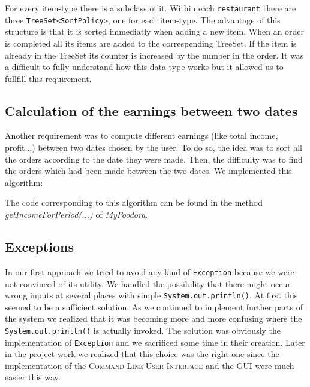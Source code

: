 

For every item-type there is a subclass of it. Within each 
\lstinline|restaurant| there are three \lstinline|TreeSet<SortPolicy>|, one for each 
item-type. The advantage of this structure is that it is sorted immediatly when adding a new 
item. When an order is completed all its items are added to the correspending TreeSet.
If the item is already in the TreeSet its counter is increased by the number in the 
order. It was a difficult to fully understand how this data-type works but it allowed us
to fullfill this requirement.

\subsection{Calculation of the earnings between two dates}
\label{calculation-between-2-dates}
Another requirement was to compute different earnings (like total income, profit...) between two dates chosen by the user. To do so, the idea was to sort all the orders according to the date they were made. Then, the difficulty was to find the orders which had been made between the two dates. We implemented this algorithm:

The code corresponding to this algorithm can be found in the method \textit{getIncomeForPeriod(...)} of \textit{MyFoodora}.

\subsection{Exceptions}
\label{sub:exceptions}

In our first approach we tried to avoid any kind of \lstinline|Exception| because we were
not convinced of its utility. We handled the possibility that there might occur wrong inputs at
several places with simple \lstinline|System.out.println()|. At first this seemed to be a
sufficient solution. As we continued to implement further parts of the system we realized that it
was becoming more and more confusing where the \lstinline|System.out.println()| is actually 
invoked. The solution was obviously the implementation of \lstinline|Exception| and we sacrificed
some time in their creation. Later in the project-work we realized that this choice was the right
one since the implementation of the \textsc{Command-Line-User-Interface} and the \textsc{GUI} were
much easier this way.

